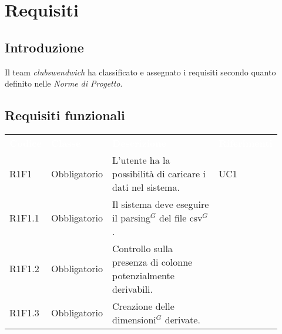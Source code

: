\section{Requisiti}
\subsection{Introduzione}
Il team \textit{clubswendwich} ha classificato e assegnato i requisiti secondo quanto definito nelle \textit{Norme di Progetto}. 
\subsection{Requisiti funzionali}
{\renewcommand{\arraystretch}{1.5}
\begin{longtable}{p{0.12\linewidth}p{0.15\linewidth}p{0.50\linewidth}p{0.15\linewidth}}
	\rowcolor[RGB]{33, 73, 50}
	\textcolor{white}{\textbf{Codice}} & \textcolor{white}{\textbf{Classe}} & \textcolor{white}{\textbf{Descrizione}} &
    \textcolor{white}{\textbf{Riferimenti}}\\
    \rowcolor[RGB]{216, 235, 171}
    R1F1 & Obbligatorio & L'utente ha la possibilità di caricare i dati nel sistema. & UC1\\
    \rowcolor[RGB]{233, 245, 206}
    R1F1.1 & Obbligatorio & Il sistema deve eseguire il parsing$^{G}$ del file csv$^{G}$. & \\
    \rowcolor[RGB]{216, 235, 171}
    R1F1.2 & Obbligatorio & Controllo sulla presenza di colonne potenzialmente derivabili. & \\
    \rowcolor[RGB]{233, 245, 206}
    R1F1.3 & Obbligatorio & Creazione delle dimensioni$^{G}$ derivate. & \\


\end{longtable}}
